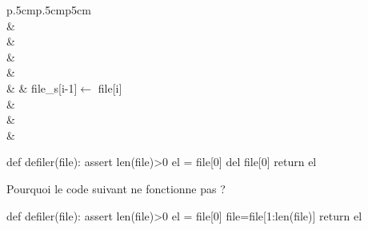 \documentclass[10pt,fleqn]{article} %
\begin{document}
\noindent \begin{minipage}[c]{.48\linewidth}
\begin{pseudo}
\begin{tabular}{p{.5cm}p{.5cm}p{5cm}}
\hline
{}  \\
& \\
& \\
& \\
& \\
& & file\_s[i-1]$\leftarrow$ file[i]\\
& \\
& \\
& \\

\hline
\end{tabular}
\end{pseudo}
\end{minipage}\hfill
\begin{minipage}[c]{.48\linewidth}
\begin{py}
\begin{python}
def defiler(file):
    assert len(file)>0
    el = file[0]
    del file[0]
    return el
\end{python}
\end{py}
\end{minipage}
\begin{rem}
Pourquoi le code suivant ne fonctionne pas ?
\begin{python}
def defiler(file):
    assert len(file)>0
    el = file[0]
    file=file[1:len(file)]
    return el
\end{python}
\end{rem}


\begin{thebibliography}{2}
\end{thebibliography}
\end{document}
